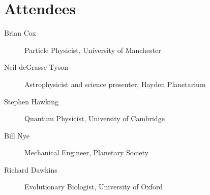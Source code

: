 \documentclass{article}
\begin{document}
\section*{Attendees}
\begin{description}
\item[Brian Cox] Particle Physicist, University of Manchester
\item[Neil deGrasse Tyson] Astrophysicist and science presenter, Hayden Planetarium
\item[Stephen Hawking] Quantum Physicist, University of Cambridge
\item[Bill Nye] Mechanical Engineer, Planetary Society
\item[Richard Dawkins] Evolutionary Biologist, University of Oxford
\end{description}
\end{document}
